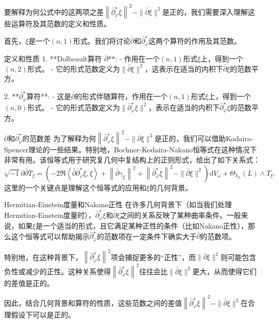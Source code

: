 要解释为何公式中的这两项之差$\left\|\bar{\partial}_{\varphi}^{\star} \xi\right\|^2-\|\bar{\partial} \xi\|^2$是正的，我们需要深入理解这些运算符及其范数的定义和性质。

首先，$\xi$是一个$(n,1)$形式。我们将讨论$\bar{\partial}$和$\bar{\partial}_{\varphi}^{\star}$这两个算符的作用及其范数。

定义和性质
1. **Dolbeault算符 $\bar{\partial}$**:
   - 作用在一个$(n,1)$形式$\xi$上，得到一个$(n,2)$形式。
   - 它的形式范数定义为$\|\bar{\partial} \xi\|^2$，这表示在适当的内积下$\bar{\partial} \xi$的范数平方。

2. **$\bar{\partial}_{\varphi}^{\star}$算符**:
   - 这是$\bar{\partial}$的形式伴随算符，作用在一个$(n,1)$形式$\xi$上，得到一个$(n,0)$形式。
   - 它的形式范数定义为$\|\bar{\partial}_{\varphi}^{\star} \xi\|^2$，表示在适当的内积下$\bar{\partial}_{\varphi}^{\star} \xi$的范数平方。

$\bar{\partial}$和$\bar{\partial}_{\varphi}^{\star}$的范数差
为了解释为何$\left\|\bar{\partial}_{\varphi}^{\star} \xi\right\|^2-\|\bar{\partial} \xi\|^2$是正的，我们可以借助Kodaira-Spencer理论的一些结果。特别地，Bochner-Kodaira-Nakano恒等式在这种情况下非常有用。该恒等式用于研究复几何中复结构上的正则形式，给出了如下关系式：
\[
\sqrt{-1} \partial \bar{\partial} T_{\xi} = \left(-2 \Re\left\langle\bar{\partial} \bar{\partial}_{\varphi}^{\star} \xi, \xi\right\rangle + \left\|\bar{\partial} \gamma_{\xi}\right\|^2 + \left\|\bar{\partial}_{\varphi}^{\star} \xi\right\|^2 - \|\bar{\partial} \xi\|^2\right) \mathrm{d}V_\omega + \Theta_{h_L}(L) \wedge T_{\xi}.
\]
这里的一个关键点是理解这个恒等式的应用和$\xi$的几何背景。

Hermitian-Einstein度量和Nakano正性
在许多几何背景下（如当我们处理Hermitian-Einstein度量时），$\bar{\partial}_{\varphi}^{\star} \xi$和$\bar{\partial} \xi$之间的关系反映了某种曲率条件。一般来说，如果$\xi$是一个适当的形式，且它满足某种正性的条件（比如Nakano正性），那么这个恒等式可以帮助揭示$\bar{\partial}_{\varphi}^{\star}$的范数项在一定条件下确实大于$\bar{\partial}$的范数项。

特别地，在这种背景下，$\left\|\bar{\partial}_{\varphi}^{\star} \xi\right\|^2$项会捕捉更多的“正性”，而$\|\bar{\partial} \xi\|^2$则可能包含负性或减少的正性。这种关系使得$\left\|\bar{\partial}_{\varphi}^{\star} \xi\right\|^2$往往会比$\|\bar{\partial} \xi\|^2$更大，从而使得它们的差值是正的。

因此，结合几何背景和算符的性质，这些范数之间的差值$\left\|\bar{\partial}_{\varphi}^{\star} \xi\right\|^2 - \|\bar{\partial} \xi\|^2$在合理假设下可以是正的。


